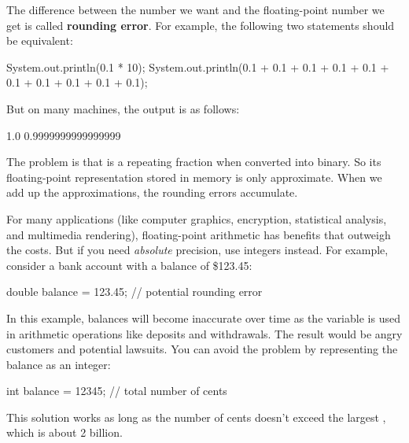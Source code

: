

The difference between the number we want and the floating-point number we get is called {\bf rounding error}.
For example, the following two statements should be equivalent:

\begin{code}
System.out.println(0.1 * 10);
System.out.println(0.1 + 0.1 + 0.1 + 0.1 + 0.1
                 + 0.1 + 0.1 + 0.1 + 0.1 + 0.1);
\end{code}

But on many machines, the output is as follows:

\begin{stdout}
1.0
0.9999999999999999
\end{stdout}

The problem is that  is a repeating fraction when converted into binary.
So its floating-point representation stored in memory is only approximate.
When we add up the approximations, the rounding errors accumulate.

For many applications (like computer graphics, encryption, statistical analysis, and multimedia rendering), floating-point arithmetic has benefits that outweigh the costs.
But if you need {\em absolute} precision, use integers instead.
For example, consider a bank account with a balance of \$123.45:

\begin{code}
double balance = 123.45;  // potential rounding error
\end{code}

In this example, balances will become inaccurate over time as the variable is used in arithmetic operations like deposits and withdrawals.
The result would be angry customers and potential lawsuits.
You can avoid the problem by representing the balance as an integer:

\begin{code}
int balance = 12345;      // total number of cents
\end{code}


This solution works as long as the number of cents doesn't exceed the largest , which is about 2 billion.


